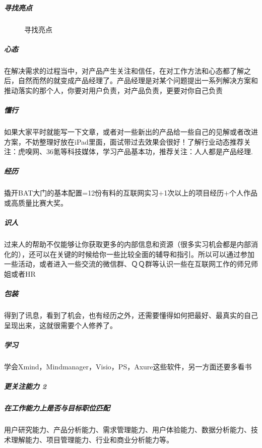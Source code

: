 \documentclass[letterpaper,10pt,english]{sphinxmanual}
\begin{document}
\subparagraph{寻找亮点}
\label{\detokenize{chapter_interview/new_like:id2}}
\begin{figure}[H]
\centering
\capstart

\noindent{}
\caption{寻找亮点}\label{\detokenize{chapter_interview/new_like:id22}}\end{figure}


\subparagraph{心态}
\label{\detokenize{chapter_interview/new_like:id3}}
在解决需求的过程当中，对产品产生关注和信任，在对工作方法和心态都了解之后，自然而然的就变成产品经理了。产品经理是对某个问题提出一系列解决方案和推动落实的那个人，你要对用户负责，对产品负责，更要对你自己负责


\subparagraph{懂行}
\label{\detokenize{chapter_interview/new_like:id4}}
如果大家平时就能写一下文章，或者对一些新出的产品给一些自己的见解或者改进方案，不妨整理好放在iPad里面，面试带过去效果会很好！了解行业动态推荐关注：虎嗅网、36氪等科技媒体，学习产品基本功，推荐关注：人人都是产品经理.


\subparagraph{经历}
\label{\detokenize{chapter_interview/new_like:id5}}
撬开BAT大门的基本配置=1\sphinxhyphen{}2份有料的互联网实习+1次以上的项目经历+个人作品或高质量比赛大奖。


\subparagraph{识人}
\label{\detokenize{chapter_interview/new_like:id6}}
过来人的帮助不仅能够让你获取更多的内部信息和资源（很多实习机会都是内部消化的），还可以在关键的时候给你一些比较全面的辅导和指引。所以可以通过参加一些活动，或者进入一些交流的微信群、ＱＱ群等认识一些在互联网工作的师兄师姐或者HR


\subparagraph{包装}
\label{\detokenize{chapter_interview/new_like:id7}}
得到了讯息，看到了机会，也有经历之外，还需要懂得如何把最好、最真实的自己呈现出来，这就很需要个人修养了。


\subparagraph{学习}
\label{\detokenize{chapter_interview/new_like:id8}}
学会Xmind，Mindmanager，Visio，PS，Axure这些软件，另一方面还要多看书


\subparagraph{更关注能力 2\sphinxfootnotemark[839]}
\label{\detokenize{chapter_interview/new_like:id9}}%
\begin{footnotetext}[839]\sphinxAtStartFootnote
{}
%
\end{footnotetext}\ignorespaces 

\subparagraph{在工作能力上是否与目标职位匹配}
\label{\detokenize{chapter_interview/new_like:id10}}
用户研究能力、产品分析能力、需求管理能力、用户体验能力、数据分析能力、技术理解能力、项目管理能力、行业和商业分析能力等。
\end{document}
